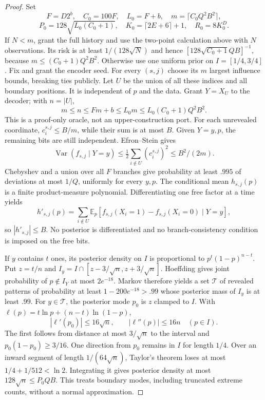 \documentclass[11pt,letterpaper]{article}
\theoremstyle{definition}\newtheorem{definition}[theorem]{Definition}
\theoremstyle{remark}\newtheorem{remark}[theorem]{Remark}
\newcommand{\E}{\mathbb{E}}
\newcommand{\Var}{\operatorname{Var}}
\begin{document}
\begin{proof}
Set
\[
 F=D2^b,\quad C_0=100F,\quad L_0=F+b,\quad
 m=\lceil C_0Q^2B^2\rceil,
\]
\[
 P_0=128\sqrt{L_0(C_0+1)},\quad
 K_0=\lceil2E+6\rceil+1,\quad R_0=8K_0^D.
\]
If $N<m$, grant the full history and use the two-point calculation above with $N$ observations. Its risk is at least $1/(128\sqrt N)$ and hence
$[128\sqrt{C_0+1}QB]^{-1}$, because $m\le(C_0+1)Q^2B^2$.
Otherwise use one uniform prior on $I=[1/4,3/4]$. Fix and grant the encoder seed. For every $(s,j)$ choose its $m$ largest influence bounds, breaking ties publicly. Let $U$ be the union of all these indices and all boundary positions. It is independent of $p$ and the data. Grant $Y=X_U$ to the decoder; with $n=|U|$,
\[
 m\le n\le Fm+b\le L_0m\le L_0(C_0+1)Q^2B^2.
\]
This is a proof-only oracle, not an upper-construction port.
For each unrevealed coordinate, $c_i^{s,j}\le B/m$, while their sum is at most $B$. Given $Y=y,p$, the remaining bits are still independent. Efron--Stein gives
\[
 \Var(f_{s,j}\mid Y=y)\le\tfrac12\sum_{i\notin U}(c_i^{s,j})^2\le B^2/(2m).
\]
Chebyshev and a union over all $F$ branches give probability at least $.995$ of deviations at most $1/Q$, uniformly for every $y,p$.
The conditional mean $h_{s,j}(p)$ is a finite product-measure polynomial. Differentiating one free factor at a time yields
\[
 h'_{s,j}(p)=\sum_{i\notin U}\E_p[f_{s,j}(X_i=1)-f_{s,j}(X_i=0)\mid Y=y],
\]
so $|h'_{s,j}|\le B$. No posterior is differentiated and no branch-consistency condition is imposed on the free bits.

If $y$ contains $t$ ones, its posterior density on $I$ is proportional to $p^t(1-p)^{n-t}$. Put $z=t/n$ and $I_y=I\cap[z-3/\sqrt n,z+3/\sqrt n]$. Hoeffding gives joint probability of $p\notin I_Y$ at most $2e^{-18}$. Markov therefore yields a set $\mathcal T$ of revealed patterns of probability at least $1-200e^{-18}>.99$ whose posterior mass of $I_y$ is at least $.99$.
For $y\in\mathcal T$, the posterior mode $p_0$ is $z$ clamped to $I$. With $\ell(p)=t\ln p+(n-t)\ln(1-p)$,
\[
 |\ell'(p_0)|\le16\sqrt n,\qquad |\ell''(p)|\le16n\quad(p\in I).
\]
The first follows from distance at most $3/\sqrt n$ to the interval and $p_0(1-p_0)\ge3/16$. One direction from $p_0$ remains in $I$ for length $1/4$. Over an inward segment of length $1/(64\sqrt n)$, Taylor's theorem loses at most $1/4+1/512<\ln2$. Integrating it gives posterior density at most $128\sqrt n\le P_0QB$. This treats boundary modes, including truncated extreme counts, without a normal approximation.


\end{proof}
\end{document}
